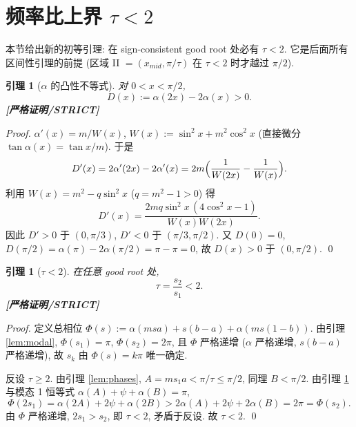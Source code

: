 \documentclass[UTF8]{ctexart}
\newtheorem{lemma}[theorem]{引理}
\newcommand{\STRICT}{\textbf{[严格证明/STRICT]}}
\begin{document}
\section{频率比上界 \texorpdfstring{$\tau<2$}{tau<2}}\label{sec:tau}

本节给出新的初等引理: 在 sign-consistent good root 处必有 $\tau<2$.
它是后面所有区间性引理的前提 (区域 II $=(x_{mid},\pi/\tau)$ 在 $\tau<2$ 时才越过
$\pi/2$).

\begin{lemma}[$\alpha$ 的凸性不等式]\label{lem:alpha2}
	对 $0<x<\pi/2$,
	\begin{equation}
		D(x):=\alpha(2x)-2\alpha(x)>0.
		\label{eq:Dpos}
	\end{equation}
	\STRICT{}
\end{lemma}

\begin{proof}
	$\alpha'(x)=m/W(x)$, $W(x):=\sin^2x+m^2\cos^2x$ (直接微分
	$\tan\alpha(x)=\tan x/m$). 于是
	\begin{equation}
		D'(x)=2\alpha'(2x)-2\alpha'(x)=2m\Bigl(\frac1{W(2x)}-\frac1{W(x)}\Bigr).
	\end{equation}
	利用 $W(x)=m^2-q\sin^2x$ ($q=m^2-1>0$) 得
	\begin{equation}
		D'(x)=\frac{2mq\sin^2x\,(4\cos^2x-1)}{W(x)W(2x)}.
		\label{eq:Dprime}
	\end{equation}
	因此 $D'>0$ 于 $(0,\pi/3)$, $D'<0$ 于 $(\pi/3,\pi/2)$. 又
	$D(0)=0$, $D(\pi/2)=\alpha(\pi)-2\alpha(\pi/2)=\pi-\pi=0$, 故
	$D(x)>0$ 于 $(0,\pi/2)$. \qed
\end{proof}

\begin{lemma}[$\tau<2$]\label{lem:taubound}
	在任意 good root 处,
	\begin{equation}
		\tau=\frac{s_2}{s_1}<2.
		\label{eq:tault2}
	\end{equation}
	\STRICT{}
\end{lemma}

\begin{proof}
	定义总相位 $\Phi(s):=\alpha(msa)+s(b-a)+\alpha(ms(1-b))$. 由引理
	\ref{lem:modal}, $\Phi(s_1)=\pi$, $\Phi(s_2)=2\pi$, 且 $\Phi$ 严格递增
	($\alpha$ 严格递增, $s(b-a)$ 严格递增), 故 $s_k$ 由 $\Phi(s)=k\pi$ 唯一确定.

	反设 $\tau\ge2$. 由引理 \ref{lem:phases}, $A=ms_1a<\pi/\tau\le\pi/2$,
	同理 $B<\pi/2$. 由引理 \ref{lem:alpha2} 与模态 1 恒等式
	$\alpha(A)+\psi+\alpha(B)=\pi$,
	\begin{equation}
		\Phi(2s_1)=\alpha(2A)+2\psi+\alpha(2B)
		>2\alpha(A)+2\psi+2\alpha(B)=2\pi=\Phi(s_2).
	\end{equation}
	由 $\Phi$ 严格递增, $2s_1>s_2$, 即 $\tau<2$, 矛盾于反设. 故
	$\tau<2$. \qed
\end{proof}
\end{document}
